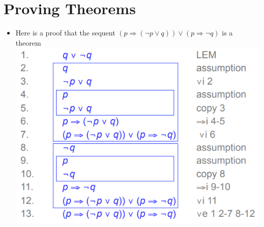 \documentclass{article}[18pt]
\begin{document}
\section{Proving Theorems}
\begin{itemize}
	\item Here is a proof that the sequent $(p\Rightarrow(\lnot p\lor q))\lor (p\Rightarrow\lnot q)$ is a theorem\\
	\includegraphics[scale=0.7]{ProvingTheorems}
	
	
\end{itemize}
\end{document}

